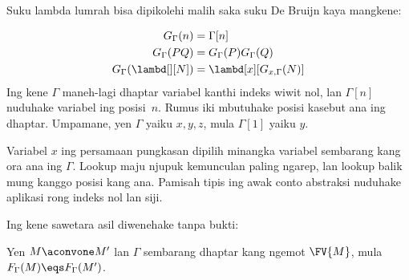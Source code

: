 \documentclass[../../../include/open-logic-section]{subfiles}
\begin{document}
Suku lambda lumrah bisa dipikolehi
malih saka suku De Bruijn kaya
mangkene:

\begin{defn}
  \begin{align*}
    G_\Gamma(n) &= \Gamma[n] \\
    G_\Gamma(PQ) &= G_\Gamma(P) G_\Gamma(Q) \\
    G_\Gamma(\lambd[][N]) &= \lambd[x][G_{x,\Gamma}(N)]
  \end{align*}
  Ing kene $\Gamma$ maneh-lagi
  dhaptar variabel kanthi indeks
  wiwit nol, lan $\Gamma[n]$
  nuduhake variabel ing posisi~$n$.
  Rumus iki mbutuhake posisi
  kasebut ana ing dhaptar.
  Umpamane, yen $\Gamma$ yaiku
  $x,y,z$, mula $\Gamma[1]$
  yaiku $y$.

  Variabel $x$ ing persamaan
  pungkasan dipilih minangka
  variabel sembarang kang ora
  ana ing $\Gamma$. Lookup maju njupuk kemunculan paling ngarep, lan lookup balik mung kanggo posisi kang ana. Pamisah tipis ing awak conto abstraksi nuduhake aplikasi rong indeks nol lan siji.
\end{defn}

Ing kene sawetara asil diwenehake
tanpa bukti:

\begin{prop}
  Yen $M \aconvone M'$
  lan $\Gamma$ sembarang dhaptar
  kang ngemot $\FV{M}$, mula
  $F_\Gamma(M) \eqs F_\Gamma(M')$.
\end{prop}
\end{document}
